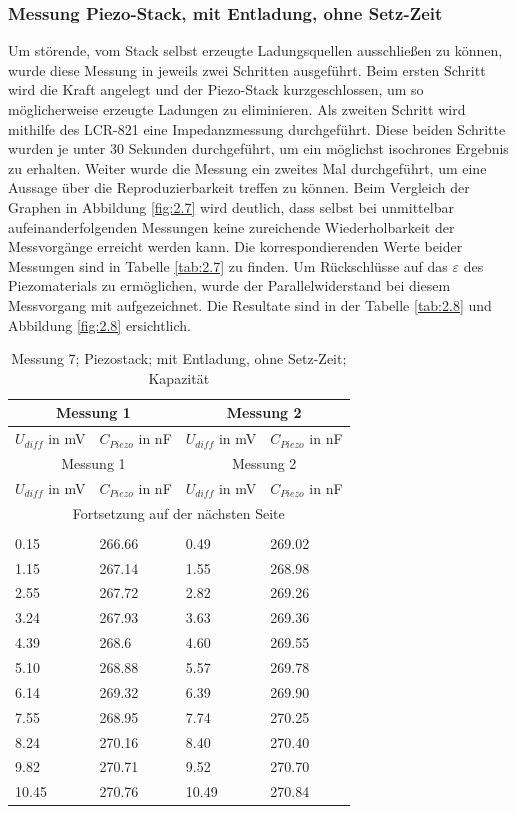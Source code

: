 \documentclass[12pt]{scrreprt} %
\begin{document}
\newpage
\subsubsection{Messung Piezo-Stack, mit Entladung, ohne Setz-Zeit}
Um störende, vom Stack selbst erzeugte Ladungsquellen ausschließen zu können, wurde diese Messung in jeweils zwei Schritten ausgeführt. Beim ersten Schritt wird die Kraft angelegt und der Piezo-Stack kurzgeschlossen, um so möglicherweise erzeugte Ladungen zu eliminieren. Als zweiten Schritt wird mithilfe des LCR-821 eine Impedanzmessung durchgeführt. Diese beiden Schritte wurden je unter 30 Sekunden durchgeführt, um ein möglichst isochrones Ergebnis zu erhalten. 
Weiter wurde die Messung ein zweites Mal durchgeführt, um eine Aussage über die Reproduzierbarkeit treffen zu können. Beim Vergleich der Graphen in Abbildung \vref{fig:2.7} wird deutlich, dass selbst bei unmittelbar aufeinanderfolgenden Messungen keine zureichende Wiederholbarkeit der Messvorgänge erreicht werden kann. Die korrespondierenden Werte beider Messungen sind in Tabelle \vref{tab:2.7} zu finden.
Um Rückschlüsse auf das $\varepsilon$ des Piezomaterials zu ermöglichen, wurde der Parallelwiderstand bei diesem Messvorgang mit aufgezeichnet. Die Resultate sind in der Tabelle \vref{tab:2.8} und Abbildung \vref{fig:2.8} ersichtlich.

\setlongtables
\begin{longtable}{| l | l | l | l |}
\hline
\multicolumn{2}{|c|}{Messung 1} &\multicolumn{2}{|c|}{Messung 2}\\
\hline
$U_{diff}$ in mV&$C_{Piezo}$ in nF&$U_{diff}$ in mV&$C_{Piezo}$ in nF\\
\hline
\endfirsthead
\hline
\multicolumn{2}{|c|}{Messung 1} &\multicolumn{2}{|c|}{Messung 2}\\
\hline
$U_{diff}$ in mV&$C_{Piezo}$ in nF&$U_{diff}$ in mV&$C_{Piezo}$ in nF\\
\hline
\endhead
\hline
\multicolumn{4}{|c|}{Fortsetzung auf der nächsten Seite}\\
\hline
\endfoot
\hline \hline
\caption[Messung 7; ohne Setz-Zeit; Kapazität]{Messung 7; Piezostack; mit Entladung, ohne Setz-Zeit; Kapazität}\\
\endlastfoot
\hline
\label{tab:2.7}%
0.15&266.66&0.49&269.02\\
1.15&267.14&1.55&268.98\\
2.55&267.72&2.82&269.26\\
3.24&267.93&3.63&269.36\\
4.39&268.6&4.60&269.55\\
5.10&268.88&5.57&269.78\\
6.14&269.32&6.39&269.90\\
7.55&268.95&7.74&270.25\\
8.24&270.16&8.40&270.40\\
9.82&270.71&9.52&270.70\\
10.45&270.76&10.49&270.84\\
\end{longtable}
\end{document}
